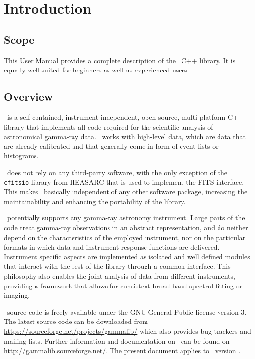 \documentclass{article}[12pt,a4]
\begin{document}
\frontpage


\section{Introduction}

\subsection{Scope}

This User Manual provides a complete description of the \this\ C++ library.
It is equally well suited for beginners as well as experienced users.


\subsection{Overview}

\this\ is a self-contained, instrument independent, open source, multi-platform C++ library
that implements all code required for the scientific analysis of astronomical gamma-ray 
data.
\this\ works with high-level data, which are data that are already calibrated and that generally
come in form of event lists or histograms.

\this\ does not rely on any third-party software, with the only
exception of the {\tt cfitsio} library from HEASARC that is used to implement the FITS interface.
This makes \this\ basically independent of any other software package,
increasing the maintainability and enhancing the portability of the library.

\this\ potentially supports any gamma-ray astronomy instrument.
Large parts of the code treat gamma-ray observations in an abstract representation, and do
neither depend on the characteristics of the employed instrument, nor on the particular
formats in which data and instrument response functions are delivered.
Instrument specific aspects are implemented as isolated and well defined modules that
interact with the rest of the library through a common interface.
This philosophy also enables the joint analysis of data from different instruments, providing
a framework that allows for consistent broad-band spectral fitting or imaging.

\this\ source code is freely available under the GNU General Public license version 3.
The latest source code can be downloaded from 
\url{https://sourceforge.net/projects/gammalib/}
which also provides bug trackers and mailing lists.
Further information and documentation on \this\ can be found on
\url{http://gammalib.sourceforge.net/}.
The present document applies to \this\ version \version.
\end{document}
